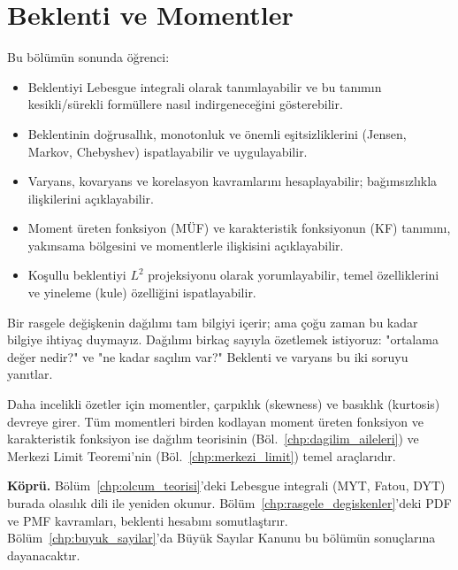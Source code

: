 \chapter{Beklenti ve Momentler}
\label{chp:beklenti}


\begin{kazanimlar}
Bu bölümün sonunda öğrenci:
\begin{itemize}
  \item Beklentiyi Lebesgue integrali olarak tanımlayabilir ve
        bu tanımın kesikli/sürekli formüllere nasıl indirgeneceğini gösterebilir.
  \item Beklentinin doğrusallık, monotonluk ve önemli eşitsizliklerini
        (Jensen, Markov, Chebyshev) ispatlayabilir ve uygulayabilir.
  \item Varyans, kovaryans ve korelasyon kavramlarını hesaplayabilir;
        bağımsızlıkla ilişkilerini açıklayabilir.
  \item Moment üreten fonksiyon (MÜF) ve karakteristik fonksiyonun (KF)
        tanımını, yakınsama bölgesini ve momentlerle ilişkisini açıklayabilir.
  \item Koşullu beklentiyi $L^2$ projeksiyonu olarak yorumlayabilir,
        temel özelliklerini ve yineleme (kule) özelliğini ispatlayabilir.
\end{itemize}
\end{kazanimlar}

\begin{motivasyon}
Bir rasgele değişkenin dağılımı tam bilgiyi içerir; ama çoğu zaman bu kadar bilgiye
ihtiyaç duymayız. Dağılımı birkaç sayıyla özetlemek istiyoruz: "ortalama değer nedir?"
ve "ne kadar saçılım var?" Beklenti ve varyans bu iki soruyu yanıtlar.

Daha incelikli özetler için momentler, çarpıklık (skewness) ve basıklık (kurtosis)
devreye girer. Tüm momentleri birden kodlayan moment üreten fonksiyon ve
karakteristik fonksiyon ise dağılım teorisinin (Böl.~\ref{chp:dagilim_aileleri})
ve Merkezi Limit Teoremi'nin (Böl.~\ref{chp:merkezi_limit}) temel araçlarıdır.

\medskip
\textbf{Köprü.} Bölüm~\ref{chp:olcum_teorisi}'deki Lebesgue integrali (MYT, Fatou, DYT)
burada olasılık dili ile yeniden okunur.
Bölüm~\ref{chp:rasgele_degiskenler}'deki PDF ve PMF kavramları, beklenti hesabını
somutlaştırır. Bölüm~\ref{chp:buyuk_sayilar}'da Büyük Sayılar Kanunu bu bölümün
sonuçlarına dayanacaktır.
\end{motivasyon}

